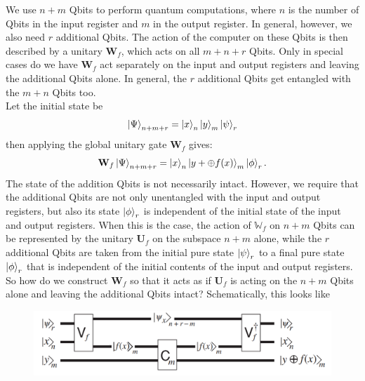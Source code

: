 \documentclass{book}
\theoremstyle{definition}
\begin{document}
We use $n+m$ Qbits to perform quantum computations, where $n$ is the number of Qbits in the input register and $m$ in the output register. In general, however, we also need $r$ additional Qbits. The action of the computer on these Qbits is then described by a unitary $\mathbf{W}_f$, which acts on all $m+n+r$ Qbits. Only in special cases do we have $\mathbf{W}_f$ act separately on the input and output registers and leaving the additional Qbits alone. In general, the $r$ additional Qbits get entangled with the $m+n$ Qbits too. \\

Let the initial state be
\begin{align}
\ket{\Psi}_{n+m+r} = \ket{x}_n \ket{y}_m \ket{\psi}_r
\end{align}
then applying the global unitary gate $\mathbf{W}_f$ gives:
\begin{align}
\mathbf{W}_f \ket{\Psi}_{n+m+r} = \ket{x}_n \ket{y+\oplus f(x)}_m \ket{\phi}_r.
\end{align}
The state of the addition Qbits is not necessarily intact. However, we require that the additional Qbits are not only unentangled with the input and output registers, but also its state $\ket{\phi}_r$ is independent of the initial state of the input and output registers. When this is the case, the action of $\mathbb{W}_f$ on $n+m$ Qbits can be represented by the unitary $\mathbf{U}_f$ on the subspace $n+m$ alone, while the $r$ additional Qbits are taken from the initial pure state $\ket{\psi}_r$ to a final pure state $\ket{\phi}_r$ that is independent of the initial contents of the input and output registers. \\

So how do we construct $\mathbf{W}_f$ so that it acts as if $\mathbf{U}_f$ is acting on the $n+m$ Qbits alone and leaving the additional Qbits intact? Schematically, this looks like
\begin{figure}[!htb]
	\centering
	\includegraphics[scale=0.6]{W}
\end{figure} 
\end{document}
